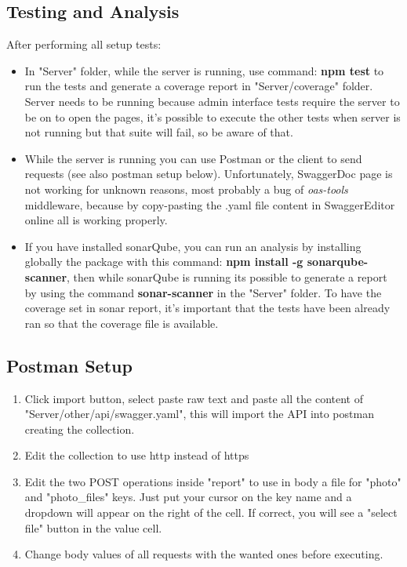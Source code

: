\subsection{Testing and Analysis}
After performing all setup tests:
\begin{itemize}
	\item In "Server" folder, while the server is running, use command: \textbf{npm test} to run the tests and generate a coverage report in "Server/coverage" folder. Server needs to be running because admin interface tests require the server to be on to open the pages, it's possible to execute the other tests when server is not running but that suite will fail, so be aware of that.
	\item While the server is running you can use Postman or the client to send requests (see also postman setup below). Unfortunately, SwaggerDoc page is not working for unknown reasons, most probably a bug of \textit{oas-tools} middleware, because by copy-pasting the .yaml file content in SwaggerEditor online all is working properly.
	\item If you have installed sonarQube, you can run an analysis by installing globally the package with this command: \textbf{npm install -g sonarqube-scanner}, then while sonarQube is running its possible to generate a report by using the command \textbf{sonar-scanner} in the "Server" folder. To have the coverage set in sonar report, it's important that the tests have been already ran so that the coverage file is available.
\end{itemize}

\subsection{Postman Setup}
\begin{enumerate}
	\item Click import button, select paste raw text and paste all the content of "Server/other/api/swagger.yaml", this will import the API into postman creating the collection.
	\item Edit the collection to use http instead of https
	\item Edit the two POST operations inside "report" to use in body a file for "photo" and "photo\_files" keys. Just put your cursor on the key name and a dropdown will appear on the right of the cell. If correct, you will see a "select file" button in the value cell.
	\item Change body values of all requests with the wanted ones before executing.
\end{enumerate}